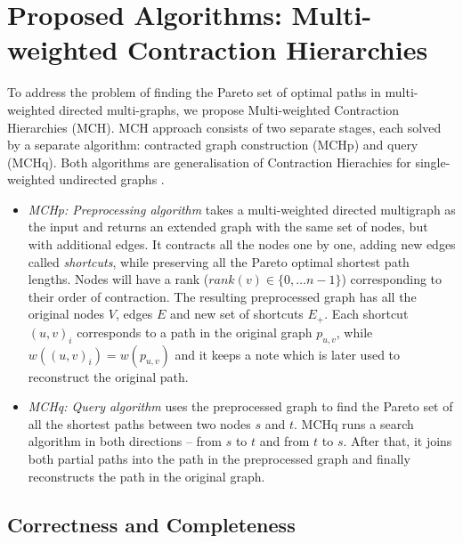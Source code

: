 
\section{Proposed Algorithms: Multi-weighted Contraction Hierarchies}
\label{secAlgorithms}

To address the problem of finding the Pareto set of optimal paths in multi-weighted directed multi-graphs, we propose Multi-weighted Contraction Hierarchies (MCH). 
MCH approach consists of two separate stages, each solved by a separate algorithm: contracted graph construction (MCHp) and query (MCHq). 
Both algorithms are generalisation of Contraction Hierachies for single-weighted undirected graphs \cite{geisberger2008contraction}.

\begin{itemize}
  \item {\em MCHp: Preprocessing algorithm} takes a multi-weighted directed multigraph as the input and returns an extended graph with the same set of nodes, but with additional edges. It contracts all the nodes one by one, adding new edges called \emph{shortcuts}, while preserving all the Pareto optimal shortest path lengths. 
Nodes will have a rank ($rank(v) \in \{0, \dots n-1\}$) corresponding to their order of contraction.
The resulting preprocessed graph has all the original nodes $V$, edges $E$ and new set of shortcuts $E_+$.
Each shortcut $(u,v)_i$ corresponds to a path in the original graph $p_{u,v}$, while $w((u,v)_i) = w(p_{u,v})$ and it keeps a note which is later used to reconstruct the original path.
  \item {\em MCHq: Query algorithm} uses the preprocessed graph to find the Pareto set of all
the shortest paths between two nodes $s$ and $t$. MCHq runs a search algorithm in both directions -- from $s$ to $t$ and from $t$ to $s$. After that, it joins both partial paths into the path in the preprocessed graph and finally reconstructs the path in the original graph. 
\end{itemize}





\subsection{Correctness and Completeness}
\label{secFormalResults}

